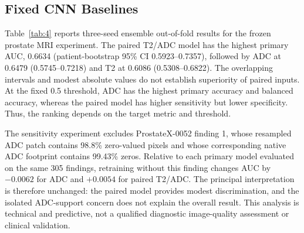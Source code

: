 \documentclass[11pt]{article}
\begin{document}
\subsection{Fixed CNN Baselines}\label{sec:4.2}

Table~\ref{tab:4} reports three-seed ensemble out-of-fold results for the frozen prostate MRI experiment. The paired T2/ADC model has the highest primary AUC, 0.6634 (patient-bootstrap 95\% CI 0.5923--0.7357), followed by ADC at 0.6479 (0.5745--0.7218) and T2 at 0.6086 (0.5308--0.6822). The overlapping intervals and modest absolute values do not establish superiority of paired inputs. At the fixed 0.5 threshold, ADC has the highest primary accuracy and balanced accuracy, whereas the paired model has higher sensitivity but lower specificity. Thus, the ranking depends on the target metric and threshold.

\begin{table}[htbp]
\centering
\scriptsize
\caption{Exploratory PROSTATEx fixed-CNN results from three-seed averaged out-of-fold predictions. Confidence intervals are based on 2,000 patient-level bootstrap replicates. AP denotes average precision; Bal. Acc. denotes balanced accuracy.}
\label{tab:4}
\end{table}

The sensitivity experiment excludes ProstateX-0052 finding 1, whose resampled ADC patch contains 98.8\% zero-valued pixels and whose corresponding native ADC footprint contains 99.43\% zeros. Relative to each primary model evaluated on the same 305 findings, retraining without this finding changes AUC by $-0.0062$ for ADC and $+0.0054$ for paired T2/ADC. The principal interpretation is therefore unchanged: the paired model provides modest discrimination, and the isolated ADC-support concern does not explain the overall result. This analysis is technical and predictive, not a qualified diagnostic image-quality assessment or clinical validation.
\end{document}
